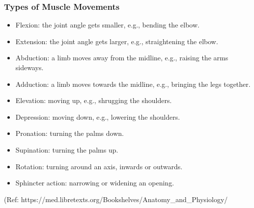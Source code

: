 \begin{frame}[fragile]\frametitle{Types of Muscle Movements}

      \begin{itemize}
		\item Flexion: the joint angle gets smaller, e.g., bending the elbow.
		\item Extension: the joint angle gets larger, e.g., straightening the elbow.
		\item Abduction: a limb moves away from the midline, e.g., raising the arms sideways.
		\item Adduction: a limb moves towards the midline, e.g., bringing the legs together.
		\item Elevation: moving up, e.g., shrugging the shoulders.
		\item Depression: moving down, e.g., lowering the shoulders.
		\item Pronation: turning the palms down.
		\item Supination: turning the palms up.
		\item Rotation: turning around an axis, inwards or outwards.
		\item Sphincter action: narrowing or widening an opening.
	  \end{itemize}

  
		{\tiny (Ref: https://med.libretexts.org/Bookshelves/Anatomy\_and\_Physiology/}		
  
\end{frame}


				

  
  

